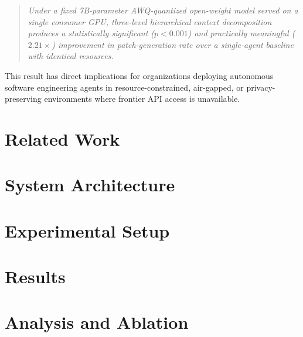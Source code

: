 \documentclass[letterpaper]{aaai25}  %
\begin{document}
\begin{quote}
  \emph{Under a fixed 7B-parameter AWQ-quantized open-weight model served
  on a single consumer GPU, three-level hierarchical context decomposition
  produces a statistically significant ($p < 0.001$) and practically
  meaningful ($2.21\times$) improvement in patch-generation rate over a
  single-agent baseline with identical resources.}
\end{quote}

This result has direct implications for organizations deploying autonomous
software engineering agents in resource-constrained, air-gapped, or
privacy-preserving environments where frontier API access is unavailable.

\section{Related Work}
\label{sec:related}



\section{System Architecture}
\label{sec:arch}



\section{Experimental Setup}
\label{sec:experiments}



\section{Results}
\label{sec:results}



\section{Analysis and Ablation}
\label{sec:analysis}
\end{document}
